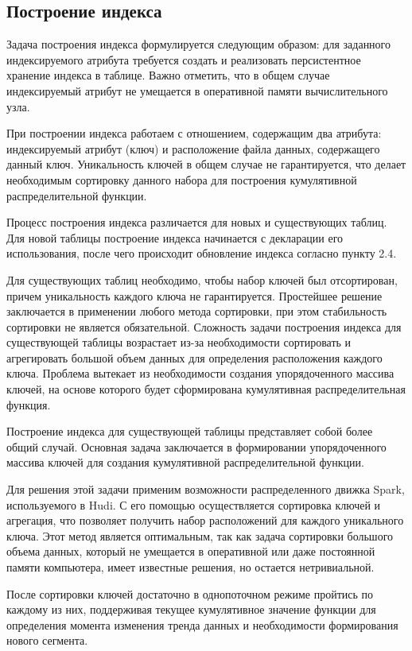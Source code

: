 \subsection{Построение индекса}

Задача построения индекса формулируется следующим образом: для заданного индексируемого атрибута требуется создать и реализовать персистентное хранение индекса в таблице. Важно отметить, что в общем случае индексируемый атрибут не умещается в оперативной памяти вычислительного узла.

При построении индекса работаем с отношением, содержащим два атрибута: индексируемый атрибут (ключ) и расположение файла данных, содержащего данный ключ. Уникальность ключей в общем случае не гарантируется, что делает необходимым сортировку данного набора для построения кумулятивной распределительной функции.

Процесс построения индекса различается для новых и существующих таблиц. Для новой таблицы построение индекса начинается с декларации его использования, после чего происходит обновление индекса согласно пункту 2.4.

Для существующих таблиц необходимо, чтобы набор ключей был отсортирован, причем уникальность каждого ключа не гарантируется. Простейшее решение заключается в применении любого метода сортировки, при этом стабильность сортировки не является обязательной. Сложность задачи построения индекса для существующей таблицы возрастает из-за необходимости сортировать и агрегировать большой объем данных для определения расположения каждого ключа. Проблема вытекает из необходимости создания упорядоченного массива ключей, на основе которого будет сформирована кумулятивная распределительная функция.

Построение индекса для существующей таблицы представляет собой более общий случай. Основная задача заключается в формировании упорядоченного массива ключей для создания кумулятивной распределительной функции.

Для решения этой задачи применим возможности распределенного движка Spark, используемого в Hudi. С его помощью осуществляется сортировка ключей и агрегация, что позволяет получить набор расположений для каждого уникального ключа. Этот метод является оптимальным, так как задача сортировки большого объема данных, который не умещается в оперативной или даже постоянной памяти компьютера, имеет известные решения, но остается нетривиальной.

После сортировки ключей достаточно в однопоточном режиме пройтись по каждому из них, поддерживая текущее кумулятивное значение функции для определения момента изменения тренда данных и необходимости формирования нового сегмента.

